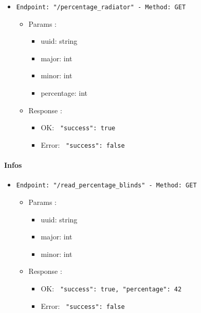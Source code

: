 \begin{itemize}
  \item \texttt{Endpoint: "/percentage_radiator" -  Method: GET}
  \begin{itemize} 
    \item Params :
    \begin{itemize}
      \item uuid: string
      \item major: int
      \item minor: int
      \item percentage: int
    \end{itemize}

    \item Response : 
    \begin{itemize}
      \item OK: \texttt{{ "success": true }}
      \item Error: \texttt{{ "success": false }}
    \end{itemize}
  \end{itemize}
\end{itemize}


\paragraph{Infos}

\begin{itemize}
  \item \texttt{Endpoint: "/read_percentage_blinds" -  Method: GET}
  \begin{itemize} 
    \item Params :
    \begin{itemize}
      \item uuid: string
      \item major: int
      \item minor: int
    \end{itemize}

    \item Response : 
    \begin{itemize}
      \item OK: \texttt{{ "success": true, "percentage": 42 }}
      \item Error: \texttt{{ "success": false }}
    \end{itemize}
  \end{itemize}
\end{itemize}



